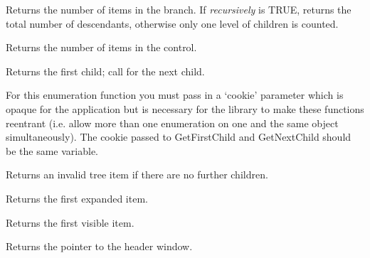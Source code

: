 
Returns the number of items in the branch. If {\it recursively} is TRUE, returns the total number
of descendants, otherwise only one level of children is counted.

\label{wxtreelistctrlgetcount}


Returns the number of items in the control.

\label{wxtreelistctrlgetfirstchild}


Returns the first child; call  for the next child.

For this enumeration function you must pass in a `cookie' parameter
which is opaque for the application but is necessary for the library
to make these functions reentrant (i.e. allow more than one
enumeration on one and the same object simultaneously). The cookie passed to
GetFirstChild and GetNextChild should be the same variable.

Returns an invalid tree item if there are no further children.


\label{wxtreelistctrlgetfirstexpandeditem}


Returns the first expanded item.

\label{wxtreelistctrlgetfirstvisibleitem}


Returns the first visible item.

\label{wxtreelistctrlgetheaderwindow}


Returns the pointer to the header window.

\label{wxtreelistctrlgetimagelist}

